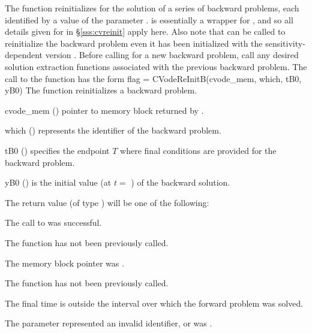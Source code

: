 The function  reinitializes {\cvodes} for the solution of a series
of backward problems, each identified by a value of the parameter .
 is essentially a wrapper for , and so
all details given for  in \S\ref{sss:cvreinit} apply
here.  Also note that  can be called to
reinitialize the backward problem even it has been initialized with the
sensitivity-dependent version .
Before calling  for a new backward problem, call any
desired solution extraction functions  associated with the
previous backward problem.
The call to the  function has the form
{
  flag = CVodeReInitB(cvode\_mem, which, tB0, yB0)
}
{
  The function  reinitializes a {\cvodes} backward problem.
}
{
  \begin{args}
  \item[cvode\_mem] ()
    pointer to {\cvodes} memory block returned by .
  \item[which] ()
    represents the identifier of the backward problem.
  \item[tB0] ()
    specifies the endpoint $T$ where final conditions are provided for the 
    backward problem.
  \item[yB0] ()
    is the initial value (at $t =$ ) of the backward solution.
  \end{args}
}
{
  The return value  (of type ) will be one of the following:
  \begin{args}
  \item[\Id{CV\_SUCCESS}]
    The call to  was successful.
  \item[\Id{CV\_NO\_MALLOC}]
    The function  has not been previously called.
  \item[\Id{CV\_MEM\_NULL}] 
    The  memory block pointer was .
  \item[\Id{CV\_NO\_ADJ}]
    The function  has not been previously called.
  \item[\Id{CV\_BAD\_TB0}]
    The final time  is outside the interval over which the forward problem
    was solved.
  \item[\Id{CV\_ILL\_INPUT}]
    The parameter  represented an invalid identifier, or
     was .
  \end{args}
}
{}


